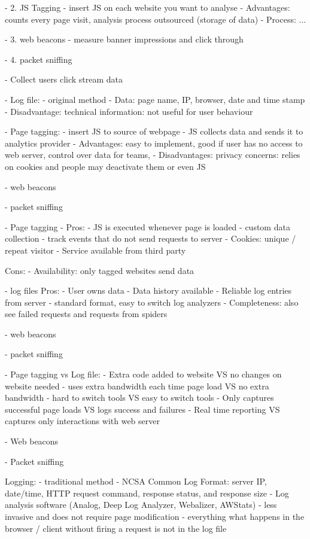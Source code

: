 - 2.  JS Tagging
- insert JS on each website you want to analyse
- Advantages: counts every page visit, analysis process outsourced (storage of data)
- Process: ...

- 3. web beacons
- measure banner impressions and click through

- 4. packet sniffing



- Collect users click stream data

- Log file:
- original method
- Data: page name, IP, browser, date and time stamp
- Disadvantage: technical information: not useful for user behaviour

- Page tagging:
- insert JS to source of webpage
- JS collects data and sends it to analytics provider
- Advantages: easy to implement, good if user has no access to web server, control over data for teams, 
- Disadvantages: privacy concerns: relies on cookies and people may deactivate them or even JS

- web beacons

- packet sniffing


- Page tagging
- Pros:
- JS is executed whenever page is loaded
- custom data collection
- track events that do not send requests to server
- Cookies: unique / repeat visitor
- Service available from third party

Cons:
- Availability: only tagged websites send data


- log files
Pros:
- User owns data
- Data history available
- Reliable log entries from server
- standard format, easy to switch log analyzers
- Completeness: also see failed requests and requests from spiders

- web beacons

- packet sniffing




- Page tagging vs Log file:
- Extra code added to website VS no changes on website needed
- uses extra bandwidth each time page load VS no extra bandwidth
- hard to switch tools VS easy to switch tools
- Only captures successful page loads VS logs success and failures
- Real time reporting VS captures only interactions with web server

- Web beacons

- Packet sniffing


Logging:
- traditional method
- NCSA Common Log Format: server IP, date/time, HTTP request command, response status, and response size
- Log analysis software (Analog, Deep Log Analyzer, Webalizer, AWStats)
- less invasive and does not require page modification
- everything what happens in the browser / client without firing a request is not in the log file

